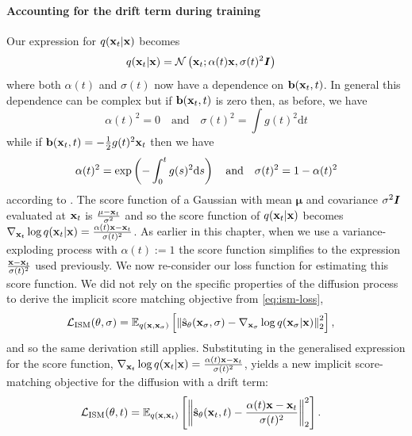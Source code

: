 \paragraph{Accounting for the drift term during training}
Our expression for $q({\mathbf{x}}_t|{\mathbf{x}})$ becomes
\begin{align} \label{eq:vp-diffusion-q-noising}
    q({\mathbf{x}}_t|{\mathbf{x}}) &= {\mathcal{N}} \left( {\mathbf{x}}_t; \alpha(t){\mathbf{x}}, \sigma(t)^2{\bm{I}} \right)
\end{align}
where both $\alpha(t)$ and $\sigma(t)$ now have a dependence on ${\mathbf{b}}({\mathbf{x}}_t, t)$. In general this dependence can be complex but if ${\mathbf{b}}({\mathbf{x}}_t, t)$ is zero then, as before, we have 
\begin{equation}
\alpha(t)^2 = 0 \quad\text{and}\quad \sigma(t)^2 = \int g(t)^2 \mathrm{d}t
\end{equation}
while if ${\mathbf{b}}({\mathbf{x}}_t, t) = - \frac{1}{2}g(t)^2{\mathbf{x}}_t$ then we have 
\begin{equation}
    \alpha(t)^2 = \text{exp}\left( - \int_0^t g(s)^2 \mathrm{d} s \right) \quad\text{and}\quad \sigma(t)^2 = 1 - \alpha(t)^2
\end{equation}
according to \citet{song2020score}. The score function of a Gaussian with mean $\mathbf{\mu}$ and covariance $\sigma^2{\bm{I}}$ evaluated at ${\mathbf{x}}_t$ is $\frac{\mathbf{\mu} - {\mathbf{x}}_t}{\sigma^2}$ and so the score function of $q({\mathbf{x}}_t|{\mathbf{x}})$ becomes $\nabla_{{\mathbf{x}}_t} \log q({\mathbf{x}}_t|{\mathbf{x}}) = \frac{\alpha(t){\mathbf{x}} - {\mathbf{x}}_t}{\sigma(t)^2}$. As earlier in this chapter, when we use a variance-exploding process with $\alpha(t) := 1$ the score function simplifies to the expression $\frac{{\mathbf{x}}-{\mathbf{x}}_t}{\sigma(t)^2}$ used previously. We now re-consider our loss function for estimating this score function. We did not rely on the specific properties of the diffusion process to derive the implicit score matching objective from \cref{eq:ism-loss},
\begin{align} \label{eq:ism-loss-with-drift}
    {\mathcal{L}}_\text{ISM}(\theta, \sigma) &= \mathbb{E}_{q({\mathbf{x}}, {\mathbf{x}}_\sigma)} \left[ 
    \left\| \hat{{\mathbf{s}}}_\theta({\mathbf{x}}_\sigma, \sigma) - \nabla_{{\mathbf{x}}_\sigma} \log q({\mathbf{x}}_\sigma|{\mathbf{x}}) \right\|_2^2 \right],
\end{align}
and so the same derivation still applies. Substituting in the generalised expression for the score function, $\nabla_{{\mathbf{x}}_t} \log q({\mathbf{x}}_t|{\mathbf{x}}) = \frac{\alpha(t){\mathbf{x}} - {\mathbf{x}}_t}{\sigma(t)^2}$, yields a new implicit score-matching objective for the diffusion with a drift term:
\begin{align}
    {\mathcal{L}}_\text{ISM}(\theta, t) &= \mathbb{E}_{q({\mathbf{x}}, {\mathbf{x}}_t)} \left[ \left\| \hat{{\mathbf{s}}}_\theta({\mathbf{x}}_t, t) - \frac{\alpha(t){\mathbf{x}} - {\mathbf{x}}_t}{\sigma(t)^2} \right\|_2^2 \right].
\end{align}
